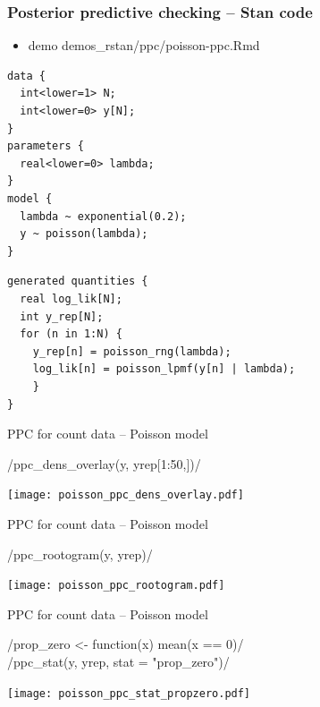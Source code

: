 \documentclass[t]{beamer}
\begin{document}
  
\begin{frame}[fragile]
  \frametitle{Posterior predictive checking -- Stan code}

  \vspace{-0.2\parskip}
  \begin{itemize}
  \item demo demos\_rstan/ppc/poisson-ppc.Rmd
  \end{itemize}

  \vspace{-0.5\parskip}
\begin{verbatim}
data {
  int<lower=1> N;
  int<lower=0> y[N];
}
parameters {
  real<lower=0> lambda;
}
model {
  lambda ~ exponential(0.2);
  y ~ poisson(lambda);
}
\end{verbatim}
  \vspace{-\parskip}
\begin{verbatim}
generated quantities {
  real log_lik[N];
  int y_rep[N];
  for (n in 1:N) {
    y_rep[n] = poisson_rng(lambda);
    log_lik[n] = poisson_lpmf(y[n] | lambda);
    }
}
\end{verbatim}
\end{frame}

\begin{frame}{PPC for count data -- Poisson model}
  
  \vspace{-1\baselineskip}
  \rinline/ppc_dens_overlay(y, yrep[1:50,])/

    \texttt{[image: poisson\_ppc\_dens\_overlay.pdf]}

\end{frame}

\begin{frame}{PPC for count data -- Poisson model}
  
  \vspace{-1\baselineskip}
  \rinline/ppc_rootogram(y, yrep)/

    \texttt{[image: poisson\_ppc\_rootogram.pdf]}

\end{frame}

\begin{frame}{PPC for count data -- Poisson model}
  
  \vspace{-1\baselineskip}
  \rinline/prop_zero <- function(x) mean(x == 0)/\\
  \rinline/ppc_stat(y, yrep, stat = "prop_zero")/

    \texttt{[image: poisson\_ppc\_stat\_propzero.pdf]}

\end{frame}
\end{document}
